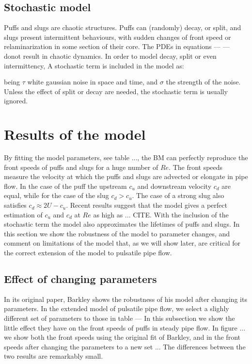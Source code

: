 \documentclass{article}
\begin{document}
\subsection{Stochastic model}
Puffs and slugs are chaotic structures. Puffs can (randomly) decay, or split, and slugs present intermittent behaviours, with sudden changes of front speed or relaminarization in some section of their core. The PDEs in equations --- --- donot result in chaotic dynamics. In order to model decay, split or even intermittency, A stochastic term is included in the model as:


being $\tau$ white gaussian noise in space and time, and $\sigma$ the strength of the noise. Unless the effect of split or decay are needed, the stochastic term is usually ignored.




\section{Results of the model}
By fitting the model parameters, see table ..., the BM can perfectly reproduce the front speeds of puffs and slugs for a huge number of $Re$. The front speeds measure the velocity at which the puffs and slugs are advected or elongate in pipe flow. In the case of the puff the upstream $c_{u}$ and downstream velocity $c_{d}$ are equal, while for the case of the slug $c_{d}>c_{u}$. The case of a strong slug also satisfies $c_{d}\approx 2U-c_{u}$. Recent results suggest that the model gives a perfect estimation of $c_{u}$ and $c_{d}$ at $Re$ as high as ... CITE. With the inclusion of the stochastic term the model also approximates the lifetimes of puffs and slugs. In this section we show the robustness of the model to parameter changes, and comment on limitations of the model that, as we will show later, are critical for the correct extension of the model to pulsatile pipe flow. 

\subsection{Effect of changing parameters}
In its original paper, Barkley shows the robustness of his model after changing its parameters. In the extended model of pulsatile pipe flow, we select a slighly different set of parameters to those in table --- In this subsection we show the little effect they have on the front speeds of puffs in steady pipe flow. In figure ... we show both the front speeds using the original fit of Barkley, and in the front speeds after changing the parameters to a new set ... The differences between the two results are remarkably small.
\end{document}

